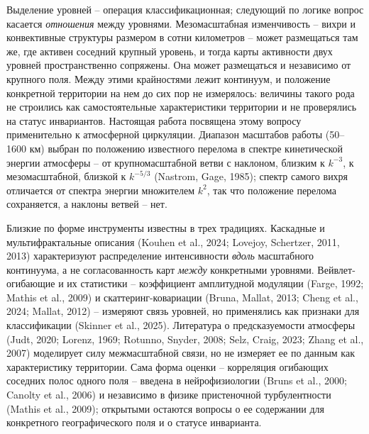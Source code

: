 \documentclass[12pt,a4paper]{article}
\begin{document}
Выделение уровней -- операция классификационная; следующий по логике вопрос касается \emph{отношения} между уровнями. Мезомасштабная изменчивость -- вихри и конвективные структуры размером в сотни километров -- может размещаться там же, где активен соседний крупный уровень, и тогда карты активности двух уровней пространственно сопряжены. Она может размещаться и независимо от крупного поля. Между этими крайностями лежит континуум, и положение конкретной территории на нем до сих пор не измерялось: величины такого рода не строились как самостоятельные характеристики территории и не проверялись на статус инвариантов. Настоящая работа посвящена этому вопросу применительно к атмосферной циркуляции. Диапазон масштабов работы (50--1600 км) выбран по положению известного перелома в спектре кинетической энергии атмосферы -- от крупномасштабной ветви с наклоном, близким к $k^{-3}$, к мезомасштабной, близкой к $k^{-5/3}$ (Nastrom, Gage, 1985); спектр самого вихря отличается от спектра энергии множителем $k^{2}$, так что положение перелома сохраняется, а наклоны ветвей -- нет.

Близкие по форме инструменты известны в трех традициях. Каскадные и мультифрактальные описания (Kouhen et al., 2024; Lovejoy, Schertzer, 2011, 2013) характеризуют распределение интенсивности \emph{вдоль} масштабного континуума, а не согласованность карт \emph{между} конкретными уровнями. Вейвлет-огибающие и их статистики -- коэффициент амплитудной модуляции (Farge, 1992; Mathis et al., 2009) и скаттеринг-ковариации (Bruna, Mallat, 2013; Cheng et al., 2024; Mallat, 2012) -- измеряют связь уровней, но применялись как признаки для классификации (Skinner et al., 2025). Литература о предсказуемости атмосферы (Judt, 2020; Lorenz, 1969; Rotunno, Snyder, 2008; Selz, Craig, 2023; Zhang et al., 2007) моделирует силу межмасштабной связи, но не измеряет ее по данным как характеристику территории. Сама форма оценки -- корреляция огибающих соседних полос одного поля -- введена в нейрофизиологии (Bruns et al., 2000; Canolty et al., 2006) и независимо в физике пристеночной турбулентности (Mathis et al., 2009); открытыми остаются вопросы о ее содержании для конкретного географического поля и о статусе инварианта.
\end{document}
